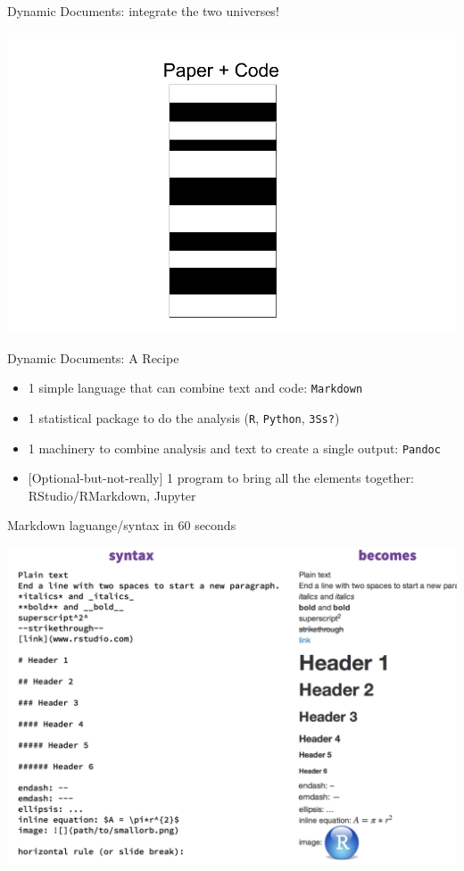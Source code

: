 \documentclass[ignorenonframetext,]{beamer}
\providecommand{\tightlist}{%
  \setlength{\itemsep}{0pt}\setlength{\parskip}{0pt}}
\begin{document}
\begin{frame}{Dynamic Documents: integrate the two universes!}

\includegraphics{../Images/One universe.png}

\end{frame}

\begin{frame}[fragile]{Dynamic Documents: A Recipe}

\begin{itemize}
\tightlist
\item
  1 simple language that can combine text and code: \texttt{Markdown}
\item
  1 statistical package to do the analysis (\texttt{R}, \texttt{Python},
  \texttt{3S\textquotesingle{}s?})
\item
  1 machinery to combine analysis and text to create a single output:
  \texttt{Pandoc}
\item
  {[}Optional-but-not-really{]} 1 program to bring all the elements
  together: RStudio/RMarkdown, Jupyter
\end{itemize}

\end{frame}

\begin{frame}{Markdown laguange/syntax in 60 seconds}

\includegraphics{../Images/RStudioCS.png}

\end{frame}
\end{document}
